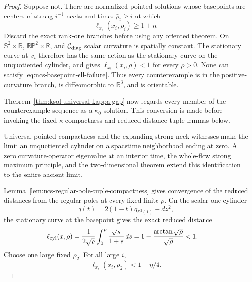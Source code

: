 \documentclass[10pt]{coll-l}
\newcommand{\R}{\mathbb{R}}
\newcommand{\Sph}{\mathbb{S}}
\theoremstyle{definition}
\theoremstyle{remark}
\numberwithin{section}{chapter}
\numberwithin{equation}{chapter}
\begin{document}
\begin{proof}
Suppose not.  There are normalized pointed solutions whose basepoints are
centers of strong $i^{-1}$-necks and times
$\bar\rho_i\geq i$ at which
\begin{equation}
                         \ell_{x_i}(x_i,\bar\rho_i)\geq1+\eta. \label{eq:ncs-basepoint-ell-failure}
\end{equation}
Discard the exact rank-one branches before using any oriented theorem.  On
$\Sph^2\times\R$, $\mathbb{RP}^2\times\R$, and
$\mathcal C_{\rm diag}$ scalar curvature is spatially constant.  The
stationary curve at $x_i$ therefore has the same action as the stationary
curve on the unquotiented cylinder, and gives
$\ell_{x_i}(x_i,\rho)<1$ for every $\rho>0$.  None can satisfy
\eqref{eq:ncs-basepoint-ell-failure}.  Thus every counterexample is in the
positive-curvature branch, is diffeomorphic to $\R^3$, and is orientable.

Theorem~\ref{thm:ksol-universal-kappa-gap} now regards every member of the
counterexample sequence as a $\kappa_0$-solution.  This conversion is made
before invoking the fixed-$\kappa$ compactness and reduced-distance tuple
lemmas below.

Universal pointed compactness and the expanding strong-neck witnesses make
the limit an unquotiented cylinder on a spacetime neighborhood ending at
zero.  A zero curvature-operator eigenvalue at an interior time, the
whole-flow strong maximum principle, and the two-dimensional theorem extend
this identification to the entire ancient limit.

Lemma~\ref{lem:ncs-regular-pole-tuple-compactness} gives convergence of the
reduced distances from the regular poles at every fixed finite $\rho$.  On
the scalar-one cylinder
\begin{equation}
          g(t)=2(1-t)g_{\Sph^2(1)}+dz^2,               \label{eq:ncs-regular-pole-cylinder}
\end{equation}
the stationary curve at the basepoint gives the exact reduced distance
\begin{align}
 \ell_{\rm cyl}(x,\rho)
 &=\frac1{2\sqrt\rho}\int_0^\rho\frac{\sqrt s}{1+s}\,ds
   =1-\frac{\arctan\sqrt\rho}{\sqrt\rho}<1.            \label{eq:ncs-regular-cylinder-base-ell}
\end{align}
Choose one large fixed $\rho_2$.  For all large $i$,
\begin{equation}
                  \ell_{x_i}(x_i,\rho_2)<1+\eta/4.     \label{eq:ncs-ell-below-before-crossing}
\end{equation}


\end{proof}
\end{document}
